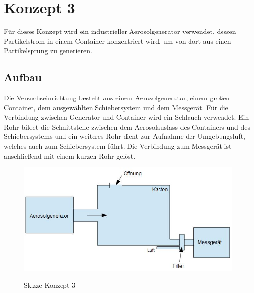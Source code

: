 \section{Konzept 3}
F\"{u}r dieses Konzept wird ein industrieller Aerosolgenerator verwendet, dessen Partikelstrom in einem Container konzentriert wird, um von dort aus einen Partikelsprung zu generieren.
\subsection{Aufbau}
Die Versuchseinrichtung besteht aus einem Aerosolgenerator, einem gro{\ss}en Container, dem ausgew\"{a}hlten Schiebersystem und dem Messger\"{a}t. F\"{u}r die Verbindung zwischen Generator und Container wird ein Schlauch verwendet. Ein Rohr bildet die Schnittstelle zwischen dem Aerosolauslass des Containers und des Schiebersystems und ein weiteres Rohr dient zur Aufnahme der Umgebungsluft, welches auch zum Schiebersystem f\"{u}hrt. Die Verbindung zum Messger\"{a}t ist anschlie{\ss}end mit einem kurzen Rohr gel\"{o}st.
\begin{figure}[H]
        \myfloatalign
        {\includegraphics[width=.9\linewidth]{gfx/concepts/Konzept_3.jpg}} \quad
        \caption[Skizze Konzept 3]
        {Skizze Konzept 3}
        \label{fig:concept_3}
\end{figure}

